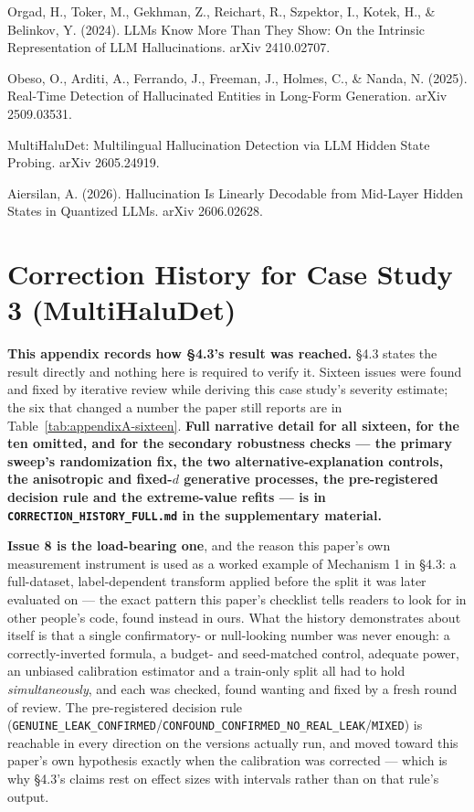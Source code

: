 \documentclass[10pt]{article} %
\begin{document}
Orgad, H., Toker, M., Gekhman, Z., Reichart, R., Szpektor, I., Kotek, H., \&
Belinkov, Y. (2024). LLMs Know More Than They Show: On the Intrinsic
Representation of LLM Hallucinations. arXiv 2410.02707.

Obeso, O., Arditi, A., Ferrando, J., Freeman, J., Holmes, C., \& Nanda, N.
(2025). Real-Time Detection of Hallucinated Entities in Long-Form Generation.
arXiv 2509.03531.

MultiHaluDet: Multilingual Hallucination Detection via LLM Hidden State
Probing. arXiv 2605.24919.

Aiersilan, A. (2026). Hallucination Is Linearly Decodable from
Mid-Layer Hidden States in Quantized LLMs. arXiv 2606.02628.

\appendix

\section{Correction History for Case Study 3 (MultiHaluDet)}
\label{app:corrections}

\textbf{This appendix records how §4.3's result was reached.} §4.3 states the
result directly and nothing here is required to verify it. Sixteen issues were
found and fixed by iterative review while deriving this case study's severity
estimate; the six that changed a number the paper still reports are in
Table~\ref{tab:appendixA-sixteen}. \textbf{Full narrative detail for all
sixteen, for the ten omitted, and for the secondary robustness checks --- the
primary sweep's randomization fix, the two alternative-explanation controls,
the anisotropic and fixed-$d$ generative processes, the pre-registered decision
rule and the extreme-value refits --- is in
\texttt{CORRECTION\_HISTORY\_FULL.md} in the supplementary material.}

\textbf{Issue 8 is the load-bearing one}, and the reason this paper's own
measurement instrument is used as a worked example of Mechanism 1 in §4.3: a
full-dataset, label-dependent transform applied before the split it was later
evaluated on --- the exact pattern this paper's checklist tells readers to look
for in other people's code, found instead in ours. What the history
demonstrates about itself is that a single confirmatory- or null-looking number
was never enough: a correctly-inverted formula, a budget- and seed-matched
control, adequate power, an unbiased calibration estimator and a train-only
split all had to hold \emph{simultaneously}, and each was checked, found
wanting and fixed by a fresh round of review. The pre-registered decision rule
(\texttt{GENUINE\_LEAK\_CONFIRMED}/\texttt{CONFOUND\_CONFIRMED\_NO\_REAL\_LEAK}/\texttt{MIXED})
is reachable in every direction on the versions actually run, and moved toward
this paper's own hypothesis exactly when the calibration was corrected --- which
is why §4.3's claims rest on effect sizes with intervals rather than on that
rule's output.
\end{document}
